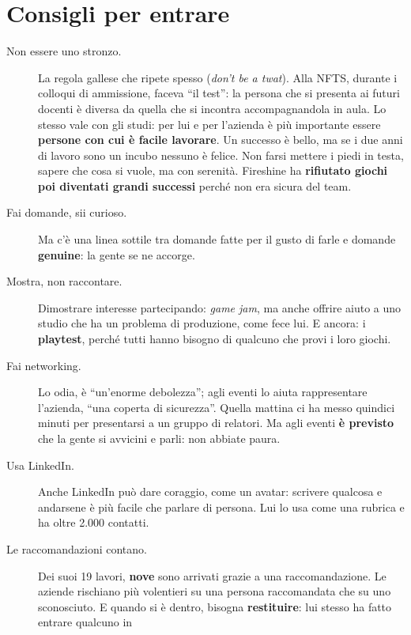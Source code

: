 \section{Consigli per entrare}
\label{sec:c2-2-consigli}

\begin{description}
  \item[Non essere uno stronzo.] La regola gallese che ripete spesso
        (\emph{don't be a twat}). Alla NFTS, durante i colloqui di ammissione,
        faceva ``il test'': la persona che si presenta ai futuri docenti è diversa
        da quella che si incontra accompagnandola in aula. Lo stesso vale con gli
        studi: per lui e per l'azienda è più importante essere \textbf{persone con
        cui è facile lavorare}. Un successo è bello, ma se i due anni di lavoro sono
        un incubo nessuno è felice. Non farsi mettere i piedi in testa, sapere che
        cosa si vuole, ma con serenità. Fireshine ha \textbf{rifiutato giochi poi
        diventati grandi successi} perché non era sicura del team.
  \item[Fai domande, sii curioso.] Ma c'è una linea sottile tra domande fatte per
        il gusto di farle e domande \textbf{genuine}: la gente se ne accorge.
  \item[Mostra, non raccontare.] Dimostrare interesse partecipando: \emph{game
        jam}, ma anche offrire aiuto a uno studio che ha un problema di
        produzione, come fece lui. E ancora: i \textbf{playtest}, perché tutti
        hanno bisogno di qualcuno che provi i loro giochi.
  \item[Fai networking.] Lo odia, è ``un'enorme debolezza''; agli eventi lo aiuta
        rappresentare l'azienda, ``una coperta di sicurezza''. Quella mattina ci
        ha messo quindici minuti per presentarsi a un gruppo di relatori. Ma agli
        eventi \textbf{è previsto} che la gente si avvicini e parli: non abbiate
        paura.
  \item[Usa LinkedIn.] Anche LinkedIn può dare coraggio, come un avatar: scrivere
        qualcosa e andarsene è più facile che parlare di persona. Lui lo usa come
        una rubrica e ha oltre 2.000 contatti.
  \item[Le raccomandazioni contano.] Dei suoi 19 lavori, \textbf{nove} sono
        arrivati grazie a una raccomandazione. Le aziende rischiano più volentieri
        su una persona raccomandata che su uno sconosciuto. E quando si è dentro,
        bisogna \textbf{restituire}: lui stesso ha fatto entrare qualcuno in

\end{description}
